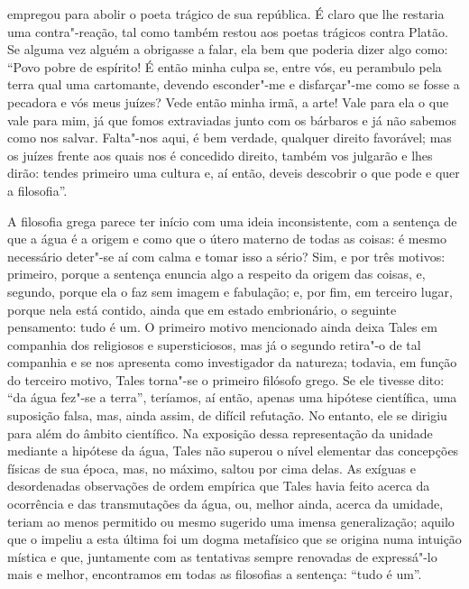 empregou para abolir o poeta trágico de sua república. É claro que lhe
restaria uma contra"-reação, tal como também restou aos poetas trágicos
contra Platão. Se alguma vez alguém a obrigasse a falar, ela bem que
poderia dizer algo como: ``Povo pobre de espírito! É então minha culpa
se, entre vós, eu perambulo pela terra qual uma cartomante, devendo
esconder"-me e disfarçar"-me como se fosse a pecadora e vós meus juízes?
Vede então minha irmã, a arte! Vale para ela o que vale para mim, já
que fomos extraviadas junto com os bárbaros e já não sabemos como nos
salvar. Falta"-nos aqui, é bem verdade, qualquer direito favorável; mas
os juízes frente aos quais nos é concedido direito, também vos julgarão
e lhes dirão: tendes primeiro uma cultura e, aí então, deveis descobrir
o que pode e quer a filosofia''.

\sectionitem

A filosofia grega parece ter início com uma ideia inconsistente, com a
sentença de que a água é a origem e como que o útero materno de todas
as coisas: é mesmo necessário deter"-se aí com calma e tomar isso a
sério? Sim, e por três motivos: primeiro, porque a sentença enuncia
algo a respeito da origem das coisas, e, segundo, porque ela o faz sem
imagem e fabulação; e, por fim, em terceiro lugar, porque nela está
contido, ainda que em estado embrionário, o seguinte pensamento: tudo é
um. O primeiro motivo mencionado ainda deixa Tales em companhia dos
religiosos e supersticiosos, mas já o segundo retira"-o de tal companhia
e se nos apresenta como investigador da natureza; todavia, em função
do terceiro motivo, Tales torna"-se o primeiro filósofo grego. Se ele
tivesse dito: ``da água fez"-se a terra'', teríamos, aí então, apenas uma
hipótese científica, uma suposição falsa, mas, ainda assim, de difícil
refutação. No entanto, ele se dirigiu para além do âmbito científico. Na
exposição dessa representação da unidade mediante a hipótese da água,
Tales não superou o nível elementar das concepções físicas de sua
época, mas, no máximo, saltou por cima delas. As exíguas e
desordenadas observações de ordem empírica que Tales havia feito acerca
da ocorrência e das transmutações da água, ou, melhor ainda, acerca da
umidade, teriam ao menos permitido ou mesmo sugerido uma imensa
generalização; aquilo que o impeliu a esta última foi um dogma	\label{foiumdogma}
metafísico que se origina numa intuição mística e que, juntamente com
as tentativas sempre renovadas de expressá"-lo mais e melhor,
encontramos em todas as filosofias a sentença: ``tudo é um''.

